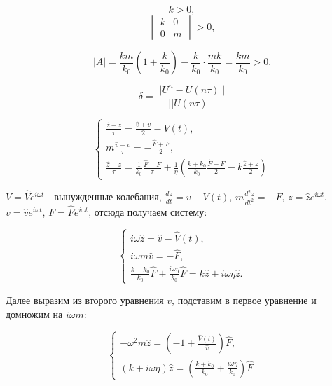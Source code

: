 \documentclass[a4paper,14pt,russian]{extreport}
\numberwithin{figure}{section}
\begin{document}
\begin{equation}
   k>0,
 \end{equation} 
\begin{equation}
\begin{vmatrix}
  k& 0\\
  0 & m
\end{vmatrix}>0, 
\end{equation}

\begin{equation}
  |A|=\frac {k m} {k_0}(1+ \frac {k} {k_0}) - \frac {k} {k_0}\cdot \frac {m k} {k_0} = \frac {km} {k_0} > 0.
\end{equation}

\begin{equation}
  \delta = \frac {||U^n - U(n\tau)||} {||U(n\tau)||}  
\end{equation}

\begin{equation}
\begin{cases}
  \displaystyle \frac {\hat{z}-z} {\tau}=\frac{\hat{v}+v}{2} - V(t),\\
  \displaystyle m\frac {\hat{v}-v} {\tau}=-\frac {\hat{F}+F} {2},\\
  \displaystyle \frac {\hat{z}-z} {\tau}=\frac {1}{k_0}\frac {\hat{F}-F} {\tau}+\frac{1}{\eta}(\frac{k+k_0}{k_0} \frac{\hat{F}+F}{2}-k\frac{\hat{z}+z}{2})
\end{cases}
\end{equation}

$V=\displaystyle \hat{V}e^{i\omega t}$ - вынужденные колебания, $\displaystyle \frac {dz} {dt}=v-V(t)$, $\displaystyle m\frac {d^2z} {dt^2} = -F$, $\displaystyle z=\hat{z}e^{i\omega t}$, $\displaystyle v=\hat{v} e^{i\omega t}$, $\displaystyle F=\hat{F}e^{i\omega t}$, отсюда получаем систему:

\begin{equation}
  \begin{cases}
    \displaystyle i\omega \hat{z}=\hat{v} - \hat{V}(t) ,\\
    \displaystyle i\omega m \hat{v}= -\hat{F} ,\\
    \displaystyle \frac {k+k_0} {k_0} \hat{F} + \frac {i\omega \eta} {k_0} \hat{F} = k\hat{z} + i\omega \eta \hat{z} .
  \end{cases} 
\end{equation}

Далее выразим из второго уравнения $v$, подставим в первое уравнение и домножим на $i \omega m$:

\begin{equation}
  \begin{cases}
    \displaystyle -\omega^2 m \hat{z}=(-1+\frac {\hat{V}(t)} {\hat{v}})\hat{F},\\
    \displaystyle (k+i\omega \eta) \hat{z}=(\frac {k+k_0}{k_0}+\frac {i\omega \eta} {k_0})\hat{F}
  \end{cases}
\end{equation}
\end{document}
